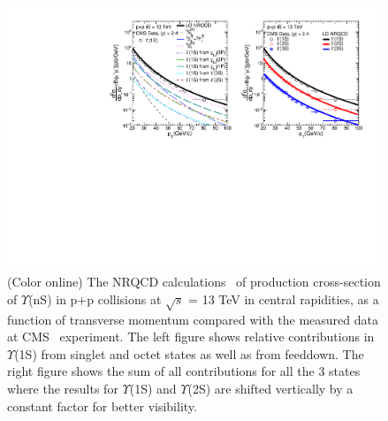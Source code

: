 \begin{figure}
  \centering
  \includegraphics[width=0.99\textwidth]{Figures/Fig3_CMS_YnS_Rap12_13TeV_Pt.pdf}
  \caption{\small{(Color online) The NRQCD calculations~\cite{Kumar:2021sek} of production cross-section of $\Upsilon$(nS)
      in p+p collisions at $\sqrt{s}$ = 13 TeV in central rapidities, as a function of
      transverse momentum compared with the measured data at CMS~\cite{Sirunyan:2017qdw}
      experiment. The left figure shows relative contributions in $\Upsilon$(1S) from
      singlet and octet states as well as from feeddown. The right figure shows the sum
      of all contributions for all the 3 states where the results for $\Upsilon$(1S) and
      $\Upsilon$(2S) are shifted vertically by a constant factor for better visibility. } }
  \label{Fig:SigmaYnSCMS13TeV}
\end{figure}



